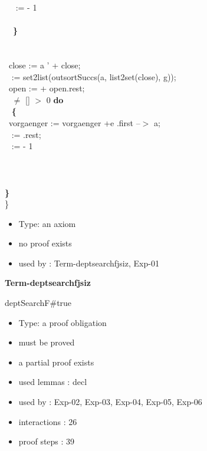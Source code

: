 \documentclass[a4paper]{article}
\begin{document}
\tabbe \tabif\ \tabbe \tabif\ \tabbe {}\tabbe {} :=  - 1\\
\tabbe \tabif\ \tabbe \tabif\ \tabbe {}\\
\tabbe \tabif\ \tabbe \tabif\ {\bf \}}\\
\tabbe \tabif\ \\
\tabbe \tabif\ \tabbe  {\bf \{}\\
\tabbe \tabif\ \tabbe \tabbe close := a ' + close;\\
\tabbe \tabif\ \tabbe \tabbe {} := set2list(outsortSuccs(a, list2set(close), g));\\
\tabbe \tabif\ \tabbe \tabbe open :=  + open.rest;\\
\tabbe \tabif\ \tabbe {}  $\neq$ [] \And {} $>$ 0 {\bf do}\\
\tabbe \tabif\ \tabbe \tabbe {} {\bf \{}\\
\tabbe \tabif\ \tabbe \tabbe {}\tabbe vorgaenger := vorgaenger +e .first --$>$ a;\\
\tabbe \tabif\ \tabbe \tabbe {}\tabbe {} := .rest;\\
\tabbe \tabif\ \tabbe \tabbe {}\tabbe {} :=  - 1\\
\tabbe \tabif\ \tabbe \tabbe {}\\
\tabbe \tabif\ \tabbe {\bf \}}\\
\tabbe \tabif\ \\
{\bf \}}\\
\}

\begin{itemize}

\item Type: an axiom

\item       no proof exists
\item       used by      : Term-deptsearchfjsiz, Exp-01
\end{itemize}

\medskip

{\LARGE\bf Term-deptsearchfjsiz}\label{lemma-Term-deptsearchfjsiz}

\medskip

 \Fol \Do deptSearchF\#\Dc true

\begin{itemize}

\item Type: a proof obligation

\item       must be proved
\item       a partial proof exists
\item       used lemmas  : decl
\item       used by      : Exp-02, Exp-03, Exp-04, Exp-05, Exp-06
\item       interactions : 26
\item       proof steps  : 39
\end{itemize}
\end{document}
